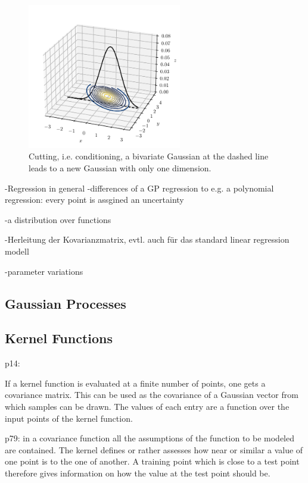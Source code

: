 \documentclass[%
  a4paper,oneside,%
  11pt,%
  smallchapters,
  green,%
  rgb, <cmyk>
  ,]{tubsbook}
\begin{document}
%
%
\begin{figure}[h]
\begin{center}
\includegraphics[width=0.6\textwidth]{pics/Gaussians3dCut}
\caption{Cutting, i.e. conditioning, a bivariate Gaussian at the dashed line leads to a new Gaussian with only one dimension.}
\label{fig:GaussCut3d}
\end{center}
\end{figure}



-Regression in general
-differences of a GP regression to e.g. a polynomial regression: every point is assgined an uncertainty

-a distribution over functions

-Herleitung der Kovarianzmatrix, evtl. auch für das standard linear regression modell

-parameter variations

\subsection{Gaussian Processes}


\subsection{Kernel Functions}
p14:

If a kernel function is evaluated at a finite number of points, one gets a covariance matrix. This can be used as the covariance of a Gaussian vector from which samples can be drawn. The values of each entry are a function over the input points of the kernel function.

p79: in a covariance function all the assumptions of the function to be modeled are contained. The kernel defines or rather assesses how near or similar a value of one point is to the one of another. A training point which is close to a test point therefore gives information on how the value at the test point should be.
\end{document}
